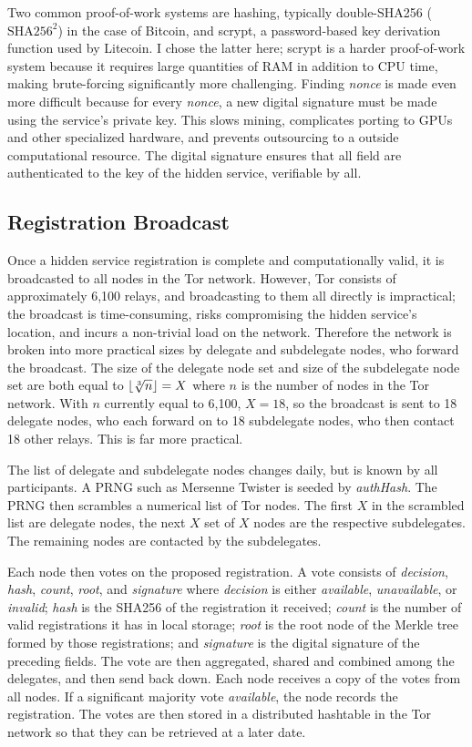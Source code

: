 \documentclass[journal]{IEEEtran}
\DeclarePairedDelimiter{\floor}{\lfloor}{\rfloor}
\begin{document}
Two common proof-of-work systems are hashing, typically double-SHA256 ($ \textrm{SHA}256^{{2}} $) in the case of Bitcoin, and scrypt, a password-based key derivation function used by Litecoin. I chose the latter here; scrypt is a harder proof-of-work system because it requires large quantities of RAM in addition to CPU time, making brute-forcing significantly more challenging. Finding \textit{nonce} is made even more difficult because for every \textit{nonce}, a new digital signature must be made using the service's private key. This slows mining, complicates porting to GPUs and other specialized hardware, and prevents outsourcing to a outside computational resource. The digital signature ensures that all field are authenticated to the key of the hidden service, verifiable by all.

\subsection{Registration Broadcast}

Once a hidden service registration is complete and computationally valid, it is broadcasted to all nodes in the Tor network. However, Tor consists of approximately 6,100 relays, and broadcasting to them all directly is impractical; the broadcast is time-consuming, risks compromising the hidden service's location, and incurs a non-trivial load on the network. Therefore the network is broken into more practical sizes by delegate and subdelegate nodes, who forward the broadcast. The size of the delegate node set and size of the subdelegate node set are both equal to $ \floor*{\sqrt[3]{n}} = X $ where $ n $ is the number of nodes in the Tor network. With $ n $ currently equal to 6,100, $ X = 18 $, so the broadcast is sent to 18 delegate nodes, who each forward on to 18 subdelegate nodes, who then contact 18 other relays. This is far more practical.

The list of delegate and subdelegate nodes changes daily, but is known by all participants. A PRNG such as Mersenne Twister is seeded by \textit{authHash}. The PRNG then scrambles a numerical list of Tor nodes. The first $ X $ in the scrambled list are delegate nodes, the next $ X $ set of $ X $ nodes are the respective subdelegates. The remaining nodes are contacted by the subdelegates.

Each node then votes on the proposed registration. A vote consists of \textit{decision}, \textit{hash}, \textit{count}, \textit{root}, and \textit{signature} where \textit{decision} is either \textit{available}, \textit{unavailable}, or \textit{invalid}; \textit{hash} is the SHA256 of the registration it received; \textit{count} is the number of valid registrations it has in local storage; \textit{root} is the root node of the Merkle tree formed by those registrations; and \textit{signature} is the digital signature of the preceding fields. The vote are then aggregated, shared and combined among the delegates, and then send back down. Each node receives a copy of the votes from all nodes. If a significant majority vote \textit{available}, the node records the registration. The votes are then stored in a distributed hashtable in the Tor network so that they can be retrieved at a later date.
\end{document}
